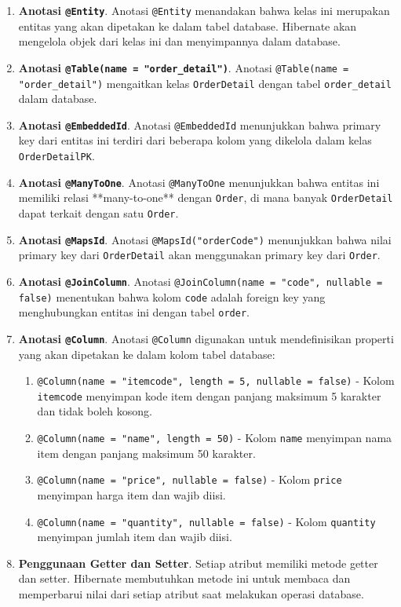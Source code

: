 \begin{enumerate}
	\item \textbf{Anotasi \texttt{@Entity}}. 
	Anotasi \texttt{@Entity} menandakan bahwa kelas ini merupakan entitas yang akan dipetakan ke dalam tabel database. Hibernate akan mengelola objek dari kelas ini dan menyimpannya dalam database.
	
	\item \textbf{Anotasi \texttt{@Table(name = "order\_detail")}}. 
	Anotasi \texttt{@Table(name = "order\_detail")} mengaitkan kelas \texttt{OrderDetail} dengan tabel \texttt{order\_detail} dalam database.
	
	\item \textbf{Anotasi \texttt{@EmbeddedId}}. 
	Anotasi \texttt{@EmbeddedId} menunjukkan bahwa primary key dari entitas ini terdiri dari beberapa kolom yang dikelola dalam kelas \texttt{OrderDetailPK}.
	
	\item \textbf{Anotasi \texttt{@ManyToOne}}. 
	Anotasi \texttt{@ManyToOne} menunjukkan bahwa entitas ini memiliki relasi **many-to-one** dengan \texttt{Order}, di mana banyak \texttt{OrderDetail} dapat terkait dengan satu \texttt{Order}.
	
	\item \textbf{Anotasi \texttt{@MapsId}}. 
	Anotasi \texttt{@MapsId("orderCode")} menunjukkan bahwa nilai primary key dari \texttt{OrderDetail} akan menggunakan primary key dari \texttt{Order}.
	
	\item \textbf{Anotasi \texttt{@JoinColumn}}. 
	Anotasi \texttt{@JoinColumn(name = "code", nullable = false)} menentukan bahwa kolom \texttt{code} adalah foreign key yang menghubungkan entitas ini dengan tabel \texttt{order}.
	
	\item \textbf{Anotasi \texttt{@Column}}. 
	Anotasi \texttt{@Column} digunakan untuk mendefinisikan properti yang akan dipetakan ke dalam kolom tabel database:
	\begin{enumerate}
		\item \texttt{@Column(name = "itemcode", length = 5, nullable = false)} - Kolom \texttt{itemcode} menyimpan kode item dengan panjang maksimum 5 karakter dan tidak boleh kosong.
		\item \texttt{@Column(name = "name", length = 50)} - Kolom \texttt{name} menyimpan nama item dengan panjang maksimum 50 karakter.
		\item \texttt{@Column(name = "price", nullable = false)} - Kolom \texttt{price} menyimpan harga item dan wajib diisi.
		\item \texttt{@Column(name = "quantity", nullable = false)} - Kolom \texttt{quantity} menyimpan jumlah item dan wajib diisi.
	\end{enumerate}
	
	\item \textbf{Penggunaan Getter dan Setter}. 
	Setiap atribut memiliki metode getter dan setter. Hibernate membutuhkan metode ini untuk membaca dan memperbarui nilai dari setiap atribut saat melakukan operasi database.
\end{enumerate}

